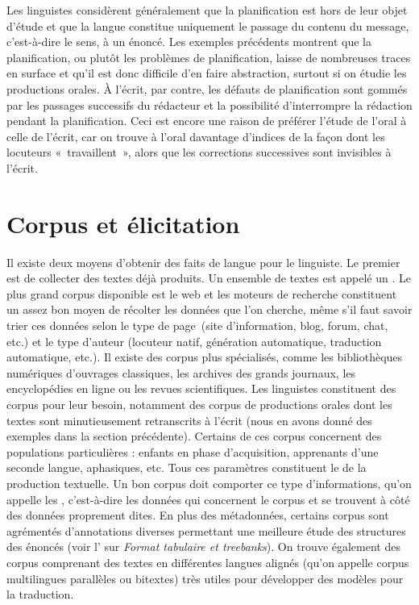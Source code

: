 Les linguistes considèrent généralement que la planification est hors de leur objet d’étude et que la langue constitue uniquement le passage du contenu du message, c’est-à-dire le sens, à un énoncé. Les exemples précédents montrent que la planification, ou plutôt les problèmes de planification, laisse de nombreuses traces en surface et qu’il est donc difficile d’en faire abstraction, surtout si on étudie les productions orales. À l’écrit, par contre, les défauts de planification sont gommés par les passages successifs du rédacteur et la possibilité d’interrompre la rédaction pendant la planification. Ceci est encore une raison de préférer l’étude de l’oral à celle de l’écrit, car on trouve à l’oral davantage d’indices de la façon dont les locuteurs «~travaillent~», alors que les corrections successives sont invisibles à l’écrit.

\section{Corpus et élicitation}\label{sec:1.1.10}

Il existe deux moyens d’obtenir des faits de langue pour le linguiste. Le premier est de collecter des textes déjà produits. Un ensemble de textes est appelé un . Le plus grand corpus disponible est le web et les moteurs de recherche constituent un assez bon moyen de récolter les données que l’on cherche, même s’il faut savoir trier ces données selon le type de page~(site d’information, blog, forum, chat, etc.) et le type d’auteur (locuteur natif, génération automatique, traduction automatique, etc.). Il existe des corpus plus spécialisés, comme les bibliothèques numériques d’ouvrages classiques, les archives des grands journaux, les encyclopédies en ligne ou les revues scientifiques. Les linguistes constituent des corpus pour leur besoin, notamment des corpus de productions orales dont les textes sont minutieusement retranscrits à l’écrit (nous en avons donné des exemples dans la section précédente). Certains de ces corpus concernent des populations particulières : enfants en phase d’acquisition, apprenants d’une seconde langue, aphasiques, etc. Tous ces paramètres constituent le  de la production textuelle. Un bon corpus doit comporter ce type d’informations, qu’on appelle les , c’est-à-dire les données qui concernent le corpus et se trouvent à côté des données proprement dites. En plus des métadonnées, certains corpus sont agrémentés d’annotations diverses permettant une meilleure étude des structures des énoncés (voir l' sur \textit{Format tabulaire et treebanks}). On trouve également des corpus comprenant des textes en différentes langues alignés (qu’on appelle corpus multilingues parallèles ou bitextes) très utiles pour développer des modèles pour la traduction.

